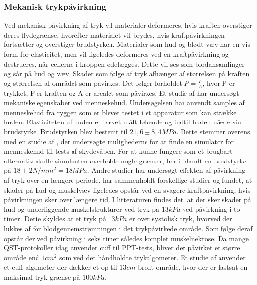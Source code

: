 \subsubsection{Mekanisk trykpåvirkning}
Ved mekanisk påvirkning af tryk vil materialer deformeres, hvis kraften overstiger deres flydegrænse, hvorefter materialet vil brydes, hvis kraftpåvirkningen fortsætter og overstiger brudstyrken. Materialer som hud og blødt væv har en vis form for elasticitet, men vil ligeledes deformeres ved en kraftpåvirkning og destrueres, når cellerne i kroppen ødelægges. Dette vil ses som blodansamlinger og sår på hud og væv. Skader som følge af tryk afhænger af størrelsen på kraften og størrelsen af området som påvirkes. Det følger forholdet $P = \frac{F}{A}$, hvor P er trykket, F er kraften og A er arealet som påvirkes. Et studie af  har undersøgt mekaniske egenskaber ved menneskehud. Undersøgelsen har anvendt samples af menneskehud fra ryggen som er blevet testet i et apparatur som kan strække huden. Elasticiteten af huden er blevet målt løbende og indtil huden nåede sin brudstyrke. Brudstyrken blev bestemt til $21,6 \pm 8,4 MPa$. Dette stemmer overens med en studie af , der undersøgte mulighederne for at finde en simulator for menneskehud til tests af skydevåben. For at kunne fungere som et brugbart alternativ skulle simulanten overholde nogle grænser, her i blandt en brudstyrke på $18 \pm 2 N/mm^{2} = 18 MPa$. Andre studier har undersøgt effekten af påvirkning af tryk over en længere periode.  har sammenholdt forskellige studier og fundet, at skader på hud og muskelvæv ligeledes opstår ved en svagere kraftpåvirkning, hvis påvirkningen sker over længere tid. I litteraturen findes det, at der sker skader på hud og underliggende muskelstrukturer ved tryk på $13 kPa$ ved påvirkning i to timer. Dette skyldes at et tryk på $13 kPa$ er over systolisk tryk, hvorved der lukkes af for blodgennemstrømningen i det trykpåvirkede område. Som følge deraf opstår der ved påvirkning i seks timer således komplet muskelnekrose. \cite{sanders1995} Da mange QST-protokoller idag anvender cuff til PPT-tests, bliver der påvirket et større område end $1 cm^{2}$ som ved det håndholdte trykalgometer. Et studie af  anvender et cuff-algometer der dækker et op til $13cm$ bredt område, hvor der er fastsat en maksimal tryk grænse på $100kPa$.

